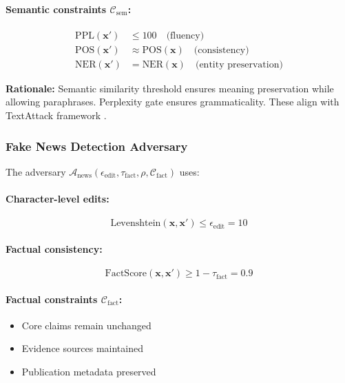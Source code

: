 \documentclass[12pt,a4paper]{article}
\theoremstyle{definition}
\newcommand{\Anews}{\mathcal{A}_{\text{news}}}
\begin{document}
\paragraph{Semantic constraints $\mathcal{C}_{\text{sem}}$:}
\begin{align}
\text{PPL}(\bm{x}') &\leq 100 \quad \text{(fluency)} \\
\text{POS}(\bm{x}') &\approx \text{POS}(\bm{x}) \quad \text{(consistency)} \\
\text{NER}(\bm{x}') &= \text{NER}(\bm{x}) \quad \text{(entity preservation)}
\end{align}

\textbf{Rationale:} Semantic similarity threshold ensures meaning preservation while allowing paraphrases. Perplexity gate ensures grammaticality. These align with TextAttack framework \citep{morris2020textattack}.

\subsubsection{Fake News Detection Adversary}

The adversary $\Anews(\epsilon_{\text{edit}}, \tau_{\text{fact}}, \rho, \mathcal{C}_{\text{fact}})$ uses:

\paragraph{Character-level edits:}
\begin{equation}
\text{Levenshtein}(\bm{x}, \bm{x}') \leq \epsilon_{\text{edit}} = 10
\end{equation}

\paragraph{Factual consistency:}
\begin{equation}
\text{FactScore}(\bm{x}, \bm{x}') \geq 1 - \tau_{\text{fact}} = 0.9
\end{equation}

\paragraph{Factual constraints $\mathcal{C}_{\text{fact}}$:}
\begin{itemize}
\item Core claims remain unchanged
\item Evidence sources maintained
\item Publication metadata preserved
\end{itemize}
\end{document}
